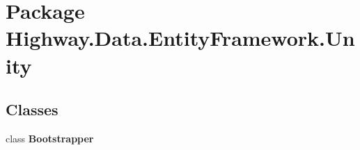 \hypertarget{namespace_highway_1_1_data_1_1_entity_framework_1_1_unity}{\section{Package Highway.\-Data.\-Entity\-Framework.\-Unity}
\label{namespace_highway_1_1_data_1_1_entity_framework_1_1_unity}
}
\subsection*{Classes}
\begin{DoxyCompactItemize}
\item 
class {\bfseries Bootstrapper}
\end{DoxyCompactItemize}
